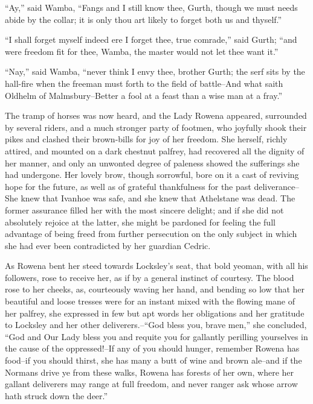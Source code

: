 ``Ay,'' said Wamba, ``Fangs and I still know thee, Gurth, though we must
needs abide by the collar; it is only thou art likely to forget both us
and thyself.''

``I shall forget myself indeed ere I forget thee, true comrade,'' said
Gurth; ``and were freedom fit for thee, Wamba, the master would not let
thee want it.''

``Nay,'' said Wamba, ``never think I envy thee, brother Gurth; the serf
sits by the hall-fire when the freeman must forth to the field of
battle--And what saith Oldhelm of Malmsbury--Better a fool at a feast
than a wise man at a fray.''

The tramp of horses was now heard, and the Lady Rowena appeared,
surrounded by several riders, and a much stronger party of footmen, who
joyfully shook their pikes and clashed their brown-bills for joy of her
freedom. She herself, richly attired, and mounted on a dark chestnut
palfrey, had recovered all the dignity of her manner, and only an
unwonted degree of paleness showed the sufferings she had undergone. Her
lovely brow, though sorrowful, bore on it a cast of reviving hope for
the future, as well as of grateful thankfulness for the past
deliverance--She knew that Ivanhoe was safe, and she knew that
Athelstane was dead. The former assurance filled her with the most
sincere delight; and if she did not absolutely rejoice at the latter,
she might be pardoned for feeling the full advantage of being freed from
further persecution on the only subject in which she had ever been
contradicted by her guardian Cedric.

As Rowena bent her steed towards Locksley's seat, that bold yeoman, with
all his followers, rose to receive her, as if by a general instinct of
courtesy. The blood rose to her cheeks, as, courteously waving her hand,
and bending so low that her beautiful and loose tresses were for an
instant mixed with the flowing mane of her palfrey, she expressed in few
but apt words her obligations and her gratitude to Locksley and her
other deliverers.--``God bless you, brave men,'' she concluded, ``God
and Our Lady bless you and requite you for gallantly perilling
yourselves in the cause of the oppressed!--If any of you should hunger,
remember Rowena has food--if you should thirst, she has many a butt of
wine and brown ale--and if the Normans drive ye from these walks, Rowena
has forests of her own, where her gallant deliverers may range at full
freedom, and never ranger ask whose arrow hath struck down the deer.''

